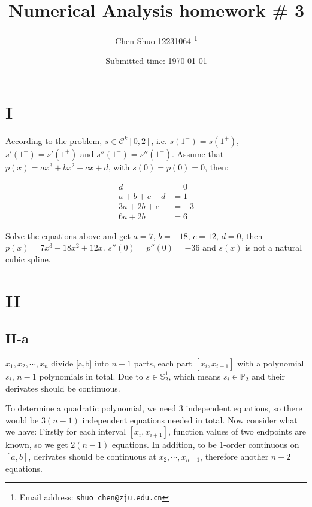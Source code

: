 \documentclass[a4paper]{article}
\begin{document}
\title{Numerical Analysis homework \# 3}

\author{Chen Shuo 12231064
  \thanks{Email address: \texttt{shuo\_chen@zju.edu.cn}}}


\date{Submitted time: \today}

\maketitle
\section*{I}
According to the problem, $s \in \mathcal{C}^k[0,2]$, i.e. $s(1^-) = s(1^+)$,$s'(1^-) = s'(1^+)$ and $s''(1^-) = s''(1^+)$. Assume that $p(x) = ax^3+bx^2+cx+d$, with $s(0)=p(0)=0$, then:

\begin{align*}
  d &= 0 \\
a+b+c+d &= 1 \\
3a+2b+c &= -3 \\
6a+2b &= 6
\end{align*}

Solve the equations above and get $a = 7$, $b = -18$, $c=12$, $d = 0$, then $p(x)=7x^3-18x^2+12x$. $s''(0) = p''(0) = -36$ and $s(x)$ is not a natural cubic spline.

\section*{II}
\subsection*{II-a}
$x_1, x_2, \cdots, x_n$ divide [a,b] into $n-1$ parts, each part $[x_i,x_{i+1}]$ with a polynomial $s_i$, $n-1$ polynomials in total. Due to $s \in \mathbb{S}_2^1$, which means $s_i \in \mathbb{P}_2$ and their derivates should be continuous.

To determine a quadratic polynomial, we need 3 independent equations, so there would be $3(n-1)$ independent equations needed in total. Now consider what we have: Firstly for each interval $[x_i,x_{i+1}]$, function values of two endpoints are 
known, so we get $2(n-1)$ equations. In addition, to be 1-order continuous on $[a,b]$, derivates should be continuous at $x_2,\cdots,x_{n-1}$, therefore another $n-2$ equations.
\end{document}
